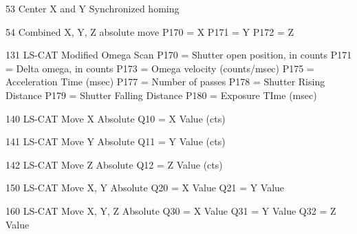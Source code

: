 \begin{DoxyPre} 53		Center X and Y Synchronized homing\end{DoxyPre}



\begin{DoxyPre} 54		Combined X, Y, Z absolute move
			P170  = X
			P171  = Y
			P172  = Z\end{DoxyPre}



\begin{DoxyPre}131		LS-CAT Modified Omega Scan
			P170	= Shutter open position, in counts
			P171    = Delta omega, in counts
			P173    = Omega velocity (counts/msec)
			P175    = Acceleration Time (msec)
			P177    = Number of passes
			P178    = Shutter Rising Distance
			P179    = Shutter Falling Distance
			P180    = Exposure TIme (msec)\end{DoxyPre}



\begin{DoxyPre}140		LS-CAT Move X Absolute
			Q10    = X Value (cts)\end{DoxyPre}



\begin{DoxyPre}141		LS-CAT Move Y Absolute
			Q11    = Y Value (cts)\end{DoxyPre}



\begin{DoxyPre}142		LS-CAT Move Z Absolute
			Q12    = Z Value (cts)\end{DoxyPre}



\begin{DoxyPre}150		LS-CAT Move X, Y Absolute
			Q20    = X Value
			Q21    = Y Value\end{DoxyPre}



\begin{DoxyPre}160		LS-CAT Move X, Y, Z  Absolute
			Q30    = X Value
			Q31    = Y Value
			Q32    = Z Value
\end{DoxyPre}
 